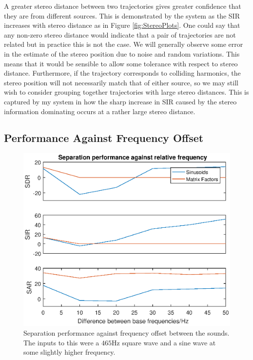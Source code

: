 \documentclass[10pt,twoside,a4paper]{report}
\begin{document}
A greater stereo distance between two trajectories gives greater confidence that they are from different sources. This is demonstrated by the system as the SIR increases with stereo distance as in Figure \ref{fig:StereoPlots}. One could say that any non-zero stereo distance would indicate that a pair of trajectories are not related but in practice this is not the case. We will generally observe some error in the estimate of the stereo position due to noise and random variations. This means that it would be sensible to allow some tolerance with respect to stereo distance. Furthermore, if the trajectory corresponds to colliding harmonics, the stereo position will not necessarily match that of either source, so we may still wish to consider grouping together trajectories with large stereo distances. This is captured by my system in how the sharp increase in SIR caused by the stereo information dominating occurs at a rather large stereo distance.

\subsection{Performance Against Frequency Offset}


\begin{figure}
\centering
\includegraphics[width=0.7\linewidth]{./FrequencyPlot}
\caption{Separation performance against frequency offset between the sounds. The inputs to this were a $ 465 $Hz square wave and a sine wave at some slightly higher frequency.}
\label{fig:FrequencyPlot}
\end{figure}
\end{document}
